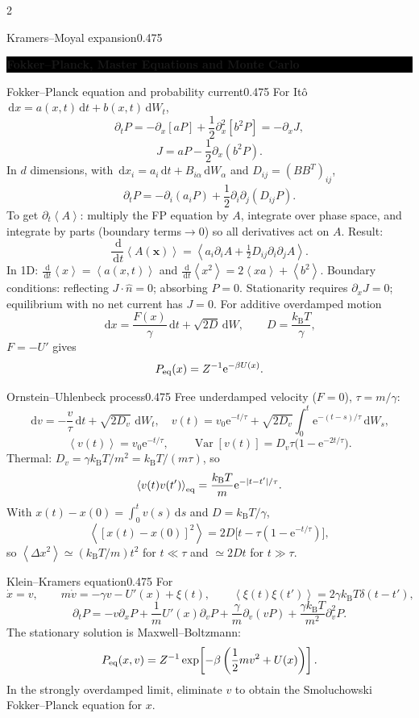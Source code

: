 \documentclass[8pt,a4paper]{extarticle}
\newcommand{\sectionbanner}[1]{%
  \par
  \Needspace{8\baselineskip}%
  \vspace{0.4ex}%
  \noindent
  \colorbox{black}{%
    \parbox{\dimexpr\linewidth-2\fboxsep\relax}{%
      \centering\color{white}\bfseries\footnotesize #1%
    }%
  }%
  \par\vspace{0.3ex}%
  \nopagebreak
}
\newcommand{\dd}{\,\mathrm d}
\newcommand{\avg}[1]{\left\langle #1\right\rangle}
\newcommand{\Var}{\operatorname{Var}}
\newcommand{\e}{\mathrm e}
\newcommand{\kb}{k_{\mathrm B}}
\begin{document}
\begin{multicols*}{2}
\begin{mytikzbox}{Kramers--Moyal expansion}{0.475}
\end{mytikzbox}
\sectionbanner{Fokker--Planck, Master Equations and Monte Carlo}
\begin{mytikzbox}{Fokker--Planck equation and probability current}{0.475}
For It\^o $\dd x=a(x,t)\dd t+b(x,t)\dd W_t$,
\[
\partial_tP=-\partial_x[aP]+\frac12\partial_x^2[b^2P]
=-\partial_xJ,
\]
\[
J=aP-\frac12\partial_x(b^2P).
\]
In $d$ dimensions, with $\dd x_i=a_i\dd t+B_{i\alpha}\dd W_\alpha$ and
$D_{ij}=(BB^T)_{ij}$,
\[
\partial_tP=-\partial_i(a_iP)+\frac12\partial_i\partial_j(D_{ij}P).
\]
To get $\partial_t\avg A$: multiply the FP equation by $A$, integrate over
phase space, and integrate by parts (boundary terms$\to0$) so all derivatives
act on $A$. Result:
\[
\frac{\dd}{\dd t}\avg{A(\bm x)}
=\avg{a_i\partial_iA+\tfrac12 D_{ij}\partial_i\partial_jA}.
\]
In 1D: $\frac{\dd}{\dd t}\avg x=\avg{a(x,t)}$ and
$\frac{\dd}{\dd t}\avg{x^2}=2\avg{xa}+\avg{b^2}$.
Boundary conditions: reflecting $J\cdot\hat n=0$; absorbing $P=0$.
Stationarity requires $\partial_xJ=0$; equilibrium with no net current has $J=0$.
For additive overdamped motion
\[
\dd x=\frac{F(x)}\gamma\dd t+\sqrt{2D}\dd W,
\qquad D=\frac{\kb T}{\gamma},
\]
$F=-U'$ gives
\[
P_{\rm eq}(x)=Z^{-1}\e^{-\beta U(x)}.
\]
\end{mytikzbox}

\begin{mytikzbox}{Ornstein--Uhlenbeck process}{0.475}
Free underdamped velocity ($F=0$), $\tau=m/\gamma$:
\[
\dd v=-\frac v\tau\dd t+\sqrt{2D_v}\,\dd W_t,
\quad
v(t)=v_0\e^{-t/\tau}
+\sqrt{2D_v}\int_0^t\e^{-(t-s)/\tau}\dd W_s,
\]
\[
\avg{v(t)}=v_0\e^{-t/\tau},
\qquad
\Var[v(t)]=D_v\tau\bigl(1-\e^{-2t/\tau}\bigr).
\]
Thermal: $D_v=\gamma\kb T/m^2=\kb T/(m\tau)$, so
\[
\avg{v(t)v(t')}_{\rm eq}
=\frac{\kb T}{m}\e^{-|t-t'|/\tau}.
\]
With $x(t)-x(0)=\int_0^t v(s)\dd s$ and $D=\kb T/\gamma$,
\[
\avg{[x(t)-x(0)]^2}
=2D\bigl[t-\tau(1-\e^{-t/\tau})\bigr],
\]
so $\avg{\Delta x^2}\simeq(\kb T/m)t^2$ for $t\ll\tau$ and
$\simeq2Dt$ for $t\gg\tau$.
\end{mytikzbox}

\begin{mytikzbox}{Klein--Kramers equation}{0.475}
For
\[
\dot x=v,
\qquad m\dot v=-\gamma v-U'(x)+\xi(t),
\qquad \avg{\xi(t)\xi(t')}=2\gamma\kb T\delta(t-t'),
\]
\[
\partial_tP=-v\partial_xP+\frac1mU'(x)\partial_vP
+\frac\gamma m\partial_v(vP)
+\frac{\gamma\kb T}{m^2}\partial_v^2P.
\]
The stationary solution is Maxwell--Boltzmann:
\[
P_{\rm eq}(x,v)=Z^{-1}
\exp\!\left[-\beta\left(\frac12mv^2+U(x)\right)\right].
\]
In the strongly overdamped limit, eliminate $v$ to obtain the Smoluchowski
Fokker--Planck equation for $x$.
\end{mytikzbox}


\end{multicols*}
\end{document}
